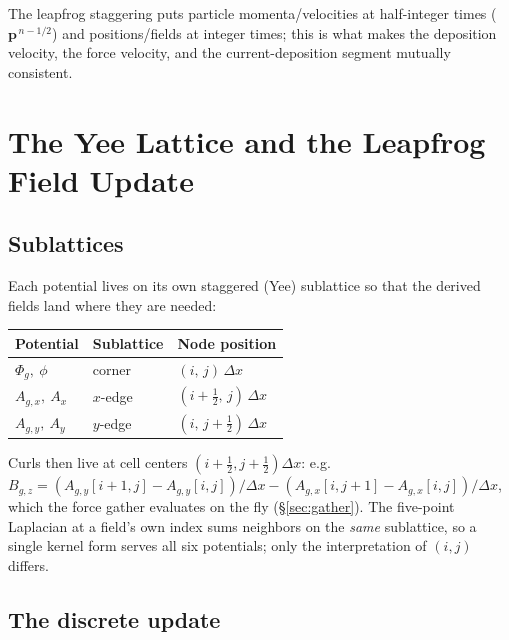 \documentclass[11pt]{article}
\newcommand{\Phig}{\Phi_g}                 %
\newcommand{\vv}[1]{\mathbf{#1}}           %
\newcommand{\dx}{\Delta x}                 %
\begin{document}
The leapfrog staggering puts particle momenta/velocities at half-integer times
($\vv{p}^{\,n-1/2}$) and positions/fields at integer times; this is what makes
the deposition velocity, the force velocity, and the current-deposition segment
mutually consistent.

\section{The Yee Lattice and the Leapfrog Field Update}
\label{sec:lattice}

\subsection{Sublattices}

Each potential lives on its own staggered (Yee) sublattice so that the derived
fields land where they are needed:
\begin{center}
\begin{tabular}{@{}L{4.8cm}L{3.4cm}L{4.6cm}@{}}
\toprule
\textbf{Potential} & \textbf{Sublattice} & \textbf{Node position} \\
\midrule
$\Phig,\ \phi$       & corner  & $(i,\,j)\,\dx$ \\
$A_{g,x},\ A_x$      & $x$-edge & $(i{+}\tfrac12,\,j)\,\dx$ \\
$A_{g,y},\ A_y$      & $y$-edge & $(i,\,j{+}\tfrac12)\,\dx$ \\
\bottomrule
\end{tabular}
\end{center}
Curls then live at cell centers $(i{+}\tfrac12,j{+}\tfrac12)\dx$: e.g.\
$B_{g,z}=(A_{g,y}[i{+}1,j]-A_{g,y}[i,j])/\dx - (A_{g,x}[i,j{+}1]-A_{g,x}[i,j])/\dx$,
which the force gather evaluates on the fly (\S\ref{sec:gather}). The five-point
Laplacian at a field's own index sums neighbors on the \emph{same} sublattice,
so a single kernel form serves all six potentials; only the interpretation of
$(i,j)$ differs.

\subsection{The discrete update}
\end{document}
